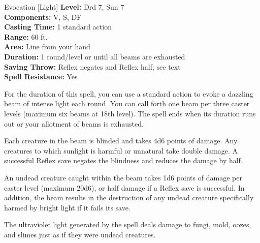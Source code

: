 {Evocation [Light]}
{
	\textbf{Level:}
	Drd 7, Sun 7\\
	\textbf{Components:}
	V, S, DF\\
	\textbf{Casting Time:}
	1 standard action\\
	\textbf{Range:}
	60 ft.\\
	\textbf{Area:}
	Line from your hand\\
	\textbf{Duration:}
	1 round/level or until all beams are exhausted\\
	\textbf{Saving Throw:}
	Reflex negates and Reflex half; see text\\
	\textbf{Spell Resistance:}
	Yes\\
}
{
	For the duration of this spell, you can use a standard action to evoke a dazzling beam of intense light each round. You can call forth one beam per three caster levels (maximum six beams at 18th level). The spell ends when its duration runs out or your allotment of beams is exhausted.

	Each creature in the beam is blinded and takes 4d6 points of damage. Any creatures to which sunlight is harmful or unnatural take double damage. A successful Reflex save negates the blindness and reduces the damage by half.

	An undead creature caught within the beam takes 1d6 points of damage per caster level (maximum 20d6), or half damage if a Reflex save is successful. In addition, the beam results in the destruction of any undead creature specifically harmed by bright light if it fails its save.

	The ultraviolet light generated by the spell deals damage to fungi, mold, oozes, and slimes just as if they were undead creatures.

}
